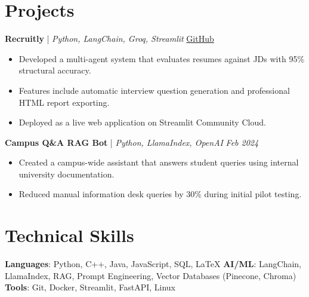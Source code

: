 \documentclass[letterpaper,10pt]{article}
\begin{document}
\section{Projects}
\textbf{Recruitly} | \textit{Python, LangChain, Groq, Streamlit} \hfill \href{https://github.com/rijulthakur34-glitch/ai-hr-shortlisting-agent}{GitHub}
\begin{itemize}
    \item Developed a multi-agent system that evaluates resumes against JDs with 95\% structural accuracy.
    \item Features include automatic interview question generation and professional HTML report exporting.
    \item Deployed as a live web application on Streamlit Community Cloud.
\end{itemize}

\textbf{Campus Q\&A RAG Bot} | \textit{Python, LlamaIndex, OpenAI} \hfill \textit{Feb 2024}
\begin{itemize}
    \item Created a campus-wide assistant that answers student queries using internal university documentation.
    \item Reduced manual information desk queries by 30\% during initial pilot testing.
\end{itemize}

\section{Technical Skills}
\textbf{Languages}: Python, C++, Java, JavaScript, SQL, LaTeX  
\textbf{AI/ML}: LangChain, LlamaIndex, RAG, Prompt Engineering, Vector Databases (Pinecone, Chroma)  
\textbf{Tools}: Git, Docker, Streamlit, FastAPI, Linux  
\end{document}
